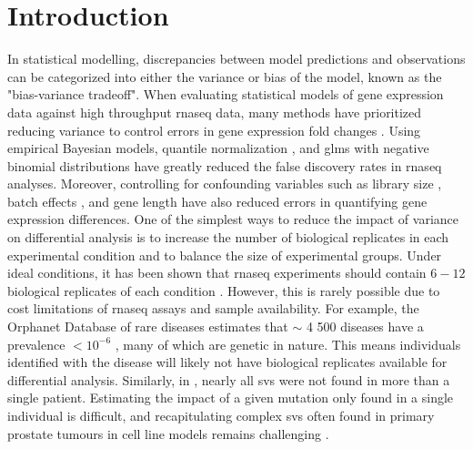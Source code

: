 \section{Introduction}

In statistical modelling, discrepancies between model predictions and observations can be categorized into either the variance or bias of the model, known as the "bias-variance tradeoff".
When evaluating statistical models of gene expression data against high throughput \gls{rnaseq} data, many methods have prioritized reducing variance to control errors in gene expression fold changes \cite{robinsonEdgeRBioconductorPackage2010,loveModeratedEstimationFold2014,hansenRemovingTechnicalVariability2012,trapnellDifferentialAnalysisGene2013,liRSEMAccurateTranscript2011,hardcastleBaySeqEmpiricalBayesian2010,ritchieLimmaPowersDifferential2015,lawVoomPrecisionWeights2014,lengEBSeqEmpiricalBayes2013,liModelingAnalysisRNAseq2018,rissoNormalizationRNAseqData2014,bullardEvaluationStatisticalMethods2010,pimentelDifferentialAnalysisRNAseq2017,yiGenelevelDifferentialAnalysis2018}.
Using empirical Bayesian \cite{hardcastleBaySeqEmpiricalBayesian2010,lengEBSeqEmpiricalBayes2013} models, quantile normalization \cite{hansenRemovingTechnicalVariability2012}, and \glspl{glm} with negative binomial distributions have greatly reduced the false discovery rates in \gls{rnaseq} analyses.
Moreover, controlling for confounding variables such as library size \cite{bullardEvaluationStatisticalMethods2010}, batch effects \cite{leekSvaPackageRemoving2012}, and gene length \cite{bullardEvaluationStatisticalMethods2010,loveModeratedEstimationFold2014,robinsonEdgeRBioconductorPackage2010,oshlackTranscriptLengthBias2009} have also reduced errors in quantifying gene expression differences.
One of the simplest ways to reduce the impact of variance on differential analysis is to increase the number of biological replicates in each experimental condition and to  balance the size of experimental groups.
Under ideal conditions, it has been shown that \gls{rnaseq} experiments should contain $6-12$ biological replicates of each condition \cite{schurchHowManyBiological2016}.
However, this is rarely possible due to cost limitations of \gls{rnaseq} assays and sample availability.
For example, the Orphanet Database of rare diseases estimates that $\sim$ 4 500 diseases have a prevalence $< 10^{-6}$ \cite{nguengangwakapEstimatingCumulativePoint2020}, many of which are genetic in nature.
This means individuals identified with the disease will likely not have biological replicates available for differential analysis.
Similarly, in , nearly all \glspl{sv} were not found in more than a single patient.
Estimating the impact of a given mutation only found in a single individual is difficult, and recapitulating complex \glspl{sv} often found in primary prostate tumours in cell line models remains challenging \cite{nakamuraCRISPRTechnologiesPrecise2021,pickar-oliverNextGenerationCRISPR2019,wangEngineering3DGenome2021}.

